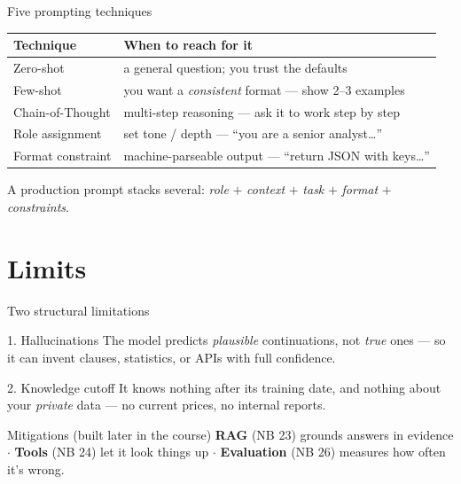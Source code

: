 \documentclass[aspectratio=169,11pt]{beamer}
\begin{document}
\begin{frame}{Five prompting techniques}
  \small
  \begin{center}
  \begin{tabular}{lp{7.0cm}}
    \toprule
    \textbf{Technique} & \textbf{When to reach for it} \\
    \midrule
    Zero-shot          & a general question; you trust the defaults \\
    Few-shot           & you want a \emph{consistent} format --- show 2--3 examples \\
    Chain-of-Thought   & multi-step reasoning --- ask it to work step by step \\
    Role assignment    & set tone / depth --- ``you are a senior analyst\ldots'' \\
    Format constraint  & machine-parseable output --- ``return JSON with keys\ldots'' \\
    \bottomrule
  \end{tabular}
  \end{center}
  {\footnotesize A production prompt stacks several: \emph{role} $+$ \emph{context} $+$ \emph{task} $+$ \emph{format} $+$ \emph{constraints}.}
\end{frame}

\section{Limits}
\begin{frame}{Two structural limitations}
  \begin{alertblock}{1. Hallucinations}
    The model predicts \emph{plausible} continuations, not \emph{true} ones --- so it can invent clauses, statistics, or APIs with full confidence.
  \end{alertblock}
  \begin{alertblock}{2. Knowledge cutoff}
    It knows nothing after its training date, and nothing about your \emph{private} data --- no current prices, no internal reports.
  \end{alertblock}
  \begin{exampleblock}{Mitigations (built later in the course)}
    \textbf{RAG} (NB 23) grounds answers in evidence $\cdot$ \textbf{Tools} (NB 24) let it look things up $\cdot$ \textbf{Evaluation} (NB 26) measures how often it's wrong.
  \end{exampleblock}
\end{frame}
\end{document}
